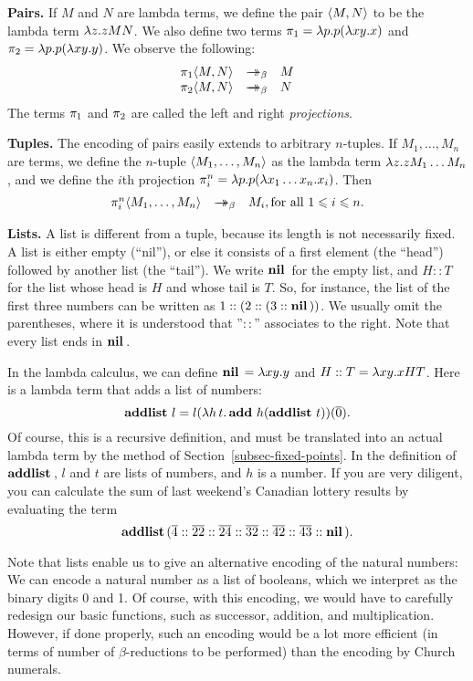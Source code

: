 \documentclass{article}
\begin{document}
{\bf Pairs.} If $M$ and $N$ are lambda terms, we define the pair
$\langle M,N\rangle$ to be the lambda term $\lambda z.zMN$. We also define two
terms $\pi_1=\lambda p.p(\lambda xy.x)$ and $\pi_2=\lambda p.p(\lambda xy.y)$.
We observe the following:
\[  \begin{array}{rcl}
  \leftt \pair{M,N} &\redbs& M \\
  \rightt \pair{M,N} &\redbs& N
\end{array}
\]
The terms $\pi_1$ and $\pi_2$ are called the left and right {\em
  projections}.

{\bf Tuples.} The encoding of pairs easily extends to arbitrary
$n$-tuples. If $M_1,\ldots,M_n$ are terms, we define the $n$-tuple
$\langle M_1,\ldots,M_n\rangle$ as the lambda term $\lambda z.zM_1\ldots M_n$,
and we define the $i$th projection $\pi^n_i=\lambda p.p(\lambda x_1\ldots
x_n.x_i)$. Then
\[ \begin{array}{rcl}
  \pi^n_i\langle M_1,\ldots,M_n\rangle &\mathrel{\rightarrow\!\!\!\!\!\rightarrow}_{\beta}& M_i, \mbox{for all $1\leqslant i\leqslant n$.}
\end{array}
\]

{\bf Lists.} A list is different from a tuple, because its length is
not necessarily fixed. A list is either empty (``nil''), or else it
consists of a first element (the ``head'') followed by another list
(the ``tail''). We write $\mathop{\textbf{\bf nil}\,}$ for the empty list, and $H::T$ for
the list whose head is $H$ and whose tail is $T$. So, for instance,
the list of the first three numbers can be written as
$1::(2::(3::\mathop{\textbf{\bf nil}\,}))$. We usually omit the parentheses, where it is
understood that ''$::$'' associates to the right. Note that every list
ends in $\mathop{\textbf{\bf nil}\,}$.

In the lambda calculus, we can define $\mathop{\textbf{\bf nil}\,}=\lambda xy.y$ and $H::T =
\lambda xy.xHT$. Here is a lambda term that adds a list of numbers:
\[ \mathop{\textbf{\bf addlist}\,} l = l(\lambda h\,t.\mathop{\textbf{\bf add}\,} h(\mathop{\textbf{\bf addlist}\,} t))(\mathop{\overline{0}}).
\]
Of course, this is a recursive definition, and must be translated into
an actual lambda term by the method of Section~\ref{subsec-fixed-points}.
In the definition of $\mathop{\textbf{\bf addlist}\,}$, $l$ and $t$ are lists of numbers,
and $h$ is a number. If you are very diligent, you can calculate the sum of
last weekend's Canadian lottery results by evaluating the term
\[ \mathop{\textbf{\bf addlist}\,} (\mathop{\overline{4}}::\mathop{\overline{22}}::\mathop{\overline{24}}::\mathop{\overline{32}}::\mathop{\overline{42}}::\mathop{\overline{43}}::\mathop{\textbf{\bf nil}\,}).
\]

Note that lists enable us to give an alternative encoding of the
natural numbers: We can encode a natural number as a list of booleans,
which we interpret as the binary digits 0 and 1. Of course, with this
encoding, we would have to carefully redesign our basic functions,
such as successor, addition, and multiplication. However, if done
properly, such an encoding would be a lot more efficient (in terms of
number of $\beta$-reductions to be performed) than the encoding by
Church numerals.
\end{document}
